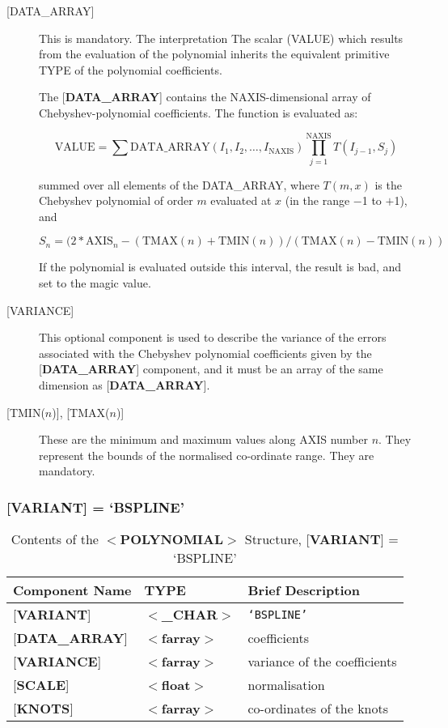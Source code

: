 \documentclass[twoside,11pt,nolof,noabs]{starlink}
\begin{document}
\begin{description}

\item [{[}DATA\_ARRAY{]}] This is mandatory.  The interpretation The
scalar (VALUE) which results from the evaluation of the polynomial
inherits the equivalent primitive TYPE of the polynomial coefficients.

The {[}\textbf{DATA\_ARRAY}{]} contains the NAXIS-dimensional
array of Chebyshev-polynomial coefficients.  The function is evaluated as:


$$\mathrm{VALUE}=\sum \mathrm{DATA\_ARRAY}(I_1,I_2,\ldots,I_{\mathrm{NAXIS}})\prod_{j=1}^{\mathrm{NAXIS}} T(I_{j-1},S_j) $$

summed over all elements of the DATA\_ARRAY, where $T(m,x)$ is the
Chebyshev polynomial of order $m$ evaluated at $x$ (in the range $-$1
to $+$1), and

$$ S_n = ( 2 * \mathrm{AXIS}_n - ( \mathrm{TMAX}(n) + \mathrm{TMIN}(n))/(\mathrm{TMAX}(n) - \mathrm{TMIN}(n)) $$


If the polynomial is evaluated outside this interval, the result is bad, and set
to the magic value.

\item [{[}VARIANCE{]}]  This optional component is used to describe the
variance of the errors associated with the Chebyshev polynomial coefficients
given by the {[}\textbf{DATA\_ARRAY}{]} component, and it must be an
array of the same dimension as {[}\textbf{DATA\_ARRAY}{]}.

\item [{[}TMIN{\rm ($n$)}{]}, {[}TMAX{\rm ($n$)}{]}]
These are the minimum and maximum values along AXIS number $n$.  They
represent the bounds of the normalised co-ordinate range.  They
are mandatory.

\end{description}


\subsubsection{{[}\textbf{VARIANT}{]} = `BSPLINE'}

\begin{table}[hbt]
\centering
\caption{Contents of the $<$\textbf{POLYNOMIAL}$>$ Structure,
               {[}\textbf{VARIANT}{]} = `BSPLINE'}
\begin{tabular}{|l|l|l|}
\hline
Component Name & TYPE & Brief Description \\ \hline
{[}\textbf{VARIANT}{]} & $<$\textbf{\_CHAR}$>$ & \texttt{`BSPLINE'} \\
{[}\textbf{DATA\_ARRAY}{]} & $<$\textbf{farray}$>$ & coefficients \\
{[}\textbf{VARIANCE}{]}  & $<$\textbf{farray}$>$ & variance of the coefficients \\
{[}\textbf{SCALE}{]}  & $<$\textbf{float}$>$ & normalisation \\
{[}\textbf{KNOTS}{]}  & $<$\textbf{farray}$>$ & co-ordinates of the knots \\ \hline
\end{tabular}
\end{table}
\end{document}

